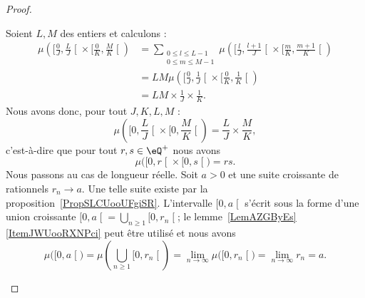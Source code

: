 \begin{proof}
\begin{subproof}
																																						Soient \( L,M\) des entiers et calculons :
																																						\begin{subequations}
																																						\begin{align}
																																						\mu\left( \mathopen[ \frac{ 0 }{ J } , \frac{ L }{ J } \mathclose[\times \mathopen[ \frac{ 0 }{ K } , \frac{ M }{ K } \mathclose[ \right) & =\sum_{\substack{0\leq l\leq L-1                                                                                                               \\0\leq m\leq M-1}}\mu\left(   \mathopen[    \frac{ l }{ J },\frac{ l+1 }{ J }  \mathclose[\times \mathopen[ \frac{ m }{ K } , \frac{ m+1 }{ K } \mathclose[      \right)\\
																																							& =LM\mu\left(  \mathopen[ \frac{ 0 }{ J } , \frac{ 1 }{ J } \mathclose[\times \mathopen[ \frac{ 0 }{ K } , \frac{ 1 }{ K } \mathclose[  \right) \\
																																							& =LM\times \frac{1}{ J }\times \frac{1}{ K }.
																																							\end{align}
																																							\end{subequations}
																																							Nous avons donc, pour tout \( J,K,L,M\) :
																																								\begin{equation}
																																								\mu\left( \mathopen[ 0 , \frac{ L }{ J } \mathclose[\times \mathopen[ 0, \frac{ M }{ K } \mathclose[ \right)=\frac{ L }{ J }\times \frac{ M }{ K },
																																								\end{equation}
																																								c'est-à-dire que pour tout \( r,s\in \eQ^+\) nous avons
																																								\begin{equation}
																																								\mu\big(   \mathopen[ 0 , r \mathclose[\times \mathopen[ 0 , s \mathclose[ \big)=rs.
																																								\end{equation}
																																								\spitem[Longueur réelle]
																																								Nous passons au cas de longueur réelle. Soit \( a>0\) et une suite croissante de rationnels \( r_n\to a\). Une telle suite existe par la proposition~\ref{PropSLCUooUFgiSR}. L'intervalle \( \mathopen[ 0 , a \mathclose[\) s'écrit sous la forme d'une union croissante \( \mathopen[ 0 , a \mathclose[=\bigcup_{n\geq 1}\mathopen[ 0 , r_n \mathclose[\); le lemme~\ref{LemAZGByEs}\ref{ItemJWUooRXNPci} peut être utilisé et nous avons
																																								\begin{equation}
																																								\mu\big( \mathopen[ 0 , a \mathclose[ \big)=\mu\left( \bigcup_{n\geq 1}\mathopen[ 0 , r_n \mathclose[ \right)=\lim_{n\to \infty} \mu\big( \mathopen[ 0 , r_n \mathclose[ \big)=\lim_{n\to \infty} r_n=a.
																																								\end{equation}
																																								\end{subproof}


\end{proof}
